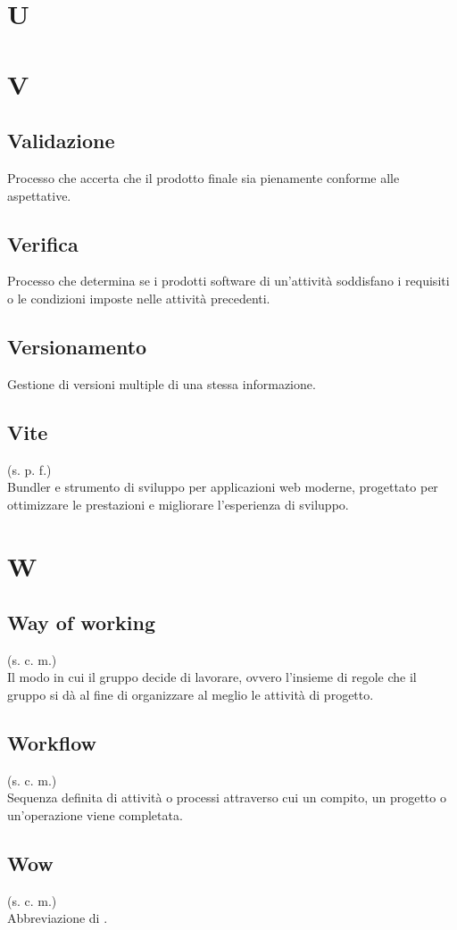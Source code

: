 \section{U}
\pagebreak
\section{V}
\subsection{Validazione}
Processo che accerta che il prodotto finale sia pienamente conforme alle
aspettative.
\subsection{Verifica}
Processo che determina se i prodotti software di un'attività soddisfano i
requisiti o le condizioni imposte nelle attività precedenti.
\subsection{Versionamento}
Gestione di versioni multiple di una stessa informazione.
\subsection{Vite}
(s. p. f.)\\
Bundler e strumento di sviluppo per applicazioni web moderne, progettato per
ottimizzare le prestazioni e migliorare l'esperienza di sviluppo.
\pagebreak
\section{W}
\subsection{Way of working}
\label{Way of working}
(s. c. m.)\\
Il modo in cui il gruppo decide di lavorare, ovvero l'insieme di regole
che il gruppo si dà al fine di organizzare al meglio le attività di progetto.
\subsection{Workflow}
(s. c. m.)\\
Sequenza definita di attività o processi attraverso cui un compito, un progetto
o un'operazione viene completata.
\subsection{Wow}
(s. c. m.)\\
Abbreviazione di .
